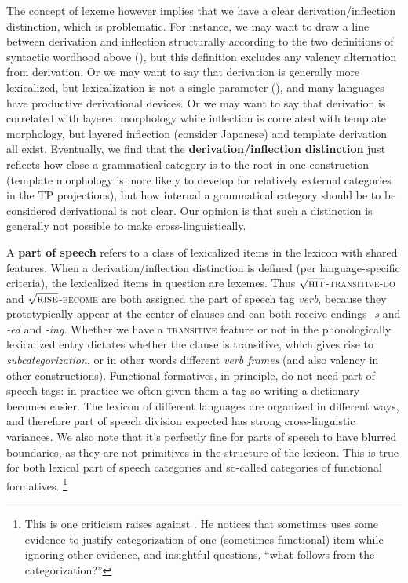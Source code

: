 \documentclass[UTF8, a4paper, oneside, scheme=plain, 12pt]{ctexrep}
\newcommand*{\concept}[1]{\textbf{#1}}
\newcommand*{\term}[1]{\emph{#1}}
\newcommand{\form}[1]{\emph{#1}}
\newcommand*{\category}[1]{\textsc{#1}}
\newcommand*{\wordroot}[1]{$\sqrt{\text{\textsc{#1}}}$}
\begin{document}
{The concept of lexeme however implies that we have a clear derivation/inflection distinction, which is problematic.
For instance, we may want to draw a line between derivation and inflection structurally
according to the two definitions of syntactic wordhood above (),
but this definition excludes any valency alternation from derivation.
Or we may want to say that derivation is generally more lexicalized,
but lexicalization is not a single parameter (),
and many languages have productive derivational devices.
Or we may want to say that derivation is correlated with layered morphology
while inflection is correlated with template morphology,
but layered inflection (consider Japanese)
and template derivation all exist.
Eventually, we find that the \concept{derivation/inflection distinction}
just reflects how close a grammatical category is to the root in one construction
(template morphology is more likely to develop for
relatively external categories in the TP projections),
but how internal a grammatical category should be to be considered derivational is not clear.
Our opinion is that such a distinction is generally not possible to make cross-linguistically.

A \concept{part of speech} refers to a class of lexicalized items in the lexicon with shared features.
When a derivation/inflection distinction is defined (per language-specific criteria),
the lexicalized items in question are lexemes.
Thus \wordroot{hit}-\category{transitive}-\category{do}
and \wordroot{rise}-\category{become}
are both assigned the part of speech tag \term{verb},
because they prototypically appear at the center of clauses
and can both receive endings \form{-s} and \form{-ed} and \form{-ing}.
Whether we have a \category{transitive} feature or not in the phonologically lexicalized entry
dictates whether the clause is transitive,
which gives rise to \term{subcategorization}, or in other words different \term{verb frames}
(and also valency in other constructions).
Functional formatives, in principle, do not need part of speech tags:
in practice we often given them a tag so writing a dictionary becomes easier.
The lexicon of different languages are organized in different ways,
and therefore part of speech division expected has strong cross-linguistic variances.
We also note that it's perfectly fine for parts of speech to have blurred boundaries,
as they are not primitives in the structure of the lexicon.
This is true for both lexical part of speech categories and
so-called categories of functional formatives.%
\footnote{
    This is one criticism \citet{culicover2004cambridge} raises against \citet{cgel}.
    He notices that \citet{cgel} sometimes uses some evidence to 
    justify categorization of one (sometimes functional) item while ignoring other evidence,
    and insightful questions, ``what follows from the categorization?''
}

}
\end{document}
